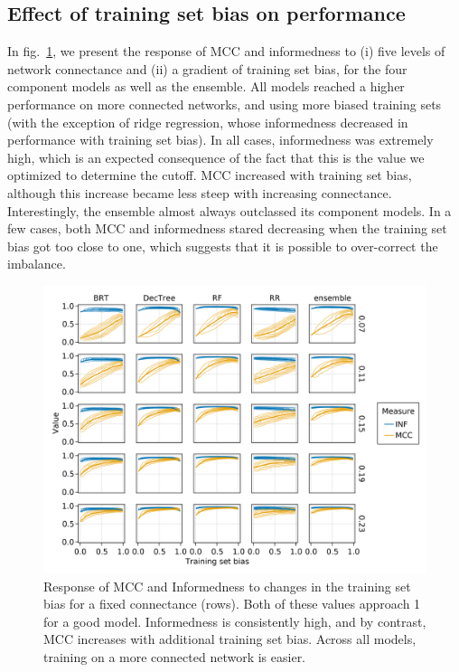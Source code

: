 \documentclass[11pt]{article}
\makeatletter
\def\maxwidth{\ifdim\Gin@nat@width>\linewidth\linewidth
\else\Gin@nat@width\fi}
\let\Oldincludegraphics\includegraphics
\renewcommand{\includegraphics}[1]{\Oldincludegraphics[width=\maxwidth]{#1}}
\makeatother
\begin{document}
\hypertarget{effect-of-training-set-bias-on-performance}{%
\subsection{Effect of training set bias on
performance}\label{effect-of-training-set-bias-on-performance}}

In fig.~\ref{fig:biasmccinf}, we present the response of MCC and
informedness to (i) five levels of network connectance and (ii) a
gradient of training set bias, for the four component models as well as
the ensemble. All models reached a higher performance on more connected
networks, and using more biased training sets (with the exception of
ridge regression, whose informedness decreased in performance with
training set bias). In all cases, informedness was extremely high, which
is an expected consequence of the fact that this is the value we
optimized to determine the cutoff. MCC increased with training set bias,
although this increase became less steep with increasing connectance.
Interestingly, the ensemble almost always outclassed its component
models. In a few cases, both MCC and informedness stared decreasing when
the training set bias got too close to one, which suggests that it is
possible to over-correct the imbalance.

\begin{figure}
\hypertarget{fig:biasmccinf}{%
\centering
\includegraphics{figures/bias_mcc_inf.png}
\caption{Response of MCC and Informedness to changes in the training set
bias for a fixed connectance (rows). Both of these values approach 1 for
a good model. Informedness is consistently high, and by contrast, MCC
increases with additional training set bias. Across all models, training
on a more connected network is easier.}\label{fig:biasmccinf}
}
\end{figure}
\end{document}
